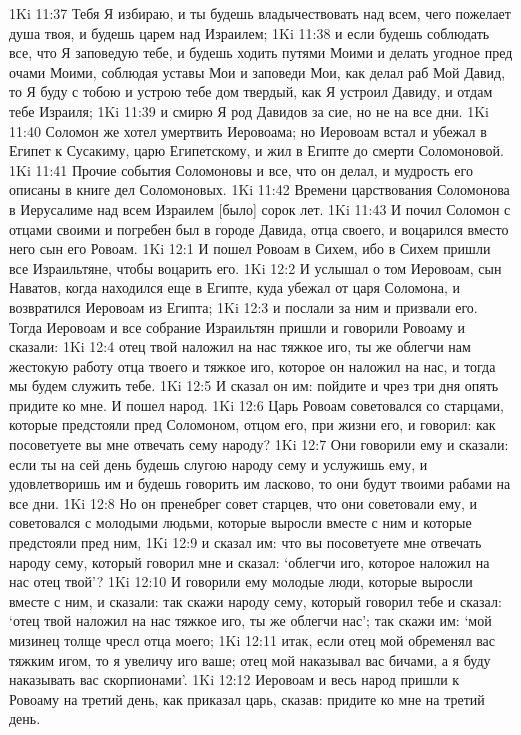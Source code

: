 1Ki 11:37  Тебя Я избираю, и ты будешь владычествовать над всем, чего пожелает душа твоя, и будешь царем над Израилем;
1Ki 11:38  и если будешь соблюдать все, что Я заповедую тебе, и будешь ходить путями Моими и делать угодное пред очами Моими, соблюдая уставы Мои и заповеди Мои, как делал раб Мой Давид, то Я буду с тобою и устрою тебе дом твердый, как Я устроил Давиду, и отдам тебе Израиля;
1Ki 11:39  и смирю Я род Давидов за сие, но не на все дни.
1Ki 11:40  Соломон же хотел умертвить Иеровоама; но Иеровоам встал и убежал в Египет к Сусакиму, царю Египетскому, и жил в Египте до смерти Соломоновой.
1Ki 11:41  Прочие события Соломоновы и все, что он делал, и мудрость его описаны в книге дел Соломоновых.
1Ki 11:42  Времени царствования Соломонова в Иерусалиме над всем Израилем [было] сорок лет.
1Ki 11:43  И почил Соломон с отцами своими и погребен был в городе Давида, отца своего, и воцарился вместо него сын его Ровоам.
1Ki 12:1  И пошел Ровоам в Сихем, ибо в Сихем пришли все Израильтяне, чтобы воцарить его.
1Ki 12:2  И услышал о том Иеровоам, сын Наватов, когда находился еще в Египте, куда убежал от царя Соломона, и возвратился Иеровоам из Египта;
1Ki 12:3  и послали за ним и призвали его. Тогда Иеровоам и все собрание Израильтян пришли и говорили Ровоаму и сказали:
1Ki 12:4  отец твой наложил на нас тяжкое иго, ты же облегчи нам жестокую работу отца твоего и тяжкое иго, которое он наложил на нас, и тогда мы будем служить тебе.
1Ki 12:5  И сказал он им: пойдите и чрез три дня опять придите ко мне. И пошел народ.
1Ki 12:6  Царь Ровоам советовался со старцами, которые предстояли пред Соломоном, отцом его, при жизни его, и говорил: как посоветуете вы мне отвечать сему народу?
1Ki 12:7  Они говорили ему и сказали: если ты на сей день будешь слугою народу сему и услужишь ему, и удовлетворишь им и будешь говорить им ласково, то они будут твоими рабами на все дни.
1Ki 12:8  Но он пренебрег совет старцев, что они советовали ему, и советовался с молодыми людьми, которые выросли вместе с ним и которые предстояли пред ним,
1Ki 12:9  и сказал им: что вы посоветуете мне отвечать народу сему, который говорил мне и сказал: `облегчи иго, которое наложил на нас отец твой'?
1Ki 12:10  И говорили ему молодые люди, которые выросли вместе с ним, и сказали: так скажи народу сему, который говорил тебе и сказал: `отец твой наложил на нас тяжкое иго, ты же облегчи нас'; так скажи им: `мой мизинец толще чресл отца моего;
1Ki 12:11  итак, если отец мой обременял вас тяжким игом, то я увеличу иго ваше; отец мой наказывал вас бичами, а я буду наказывать вас скорпионами'.
1Ki 12:12  Иеровоам и весь народ пришли к Ровоаму на третий день, как приказал царь, сказав: придите ко мне на третий день.
